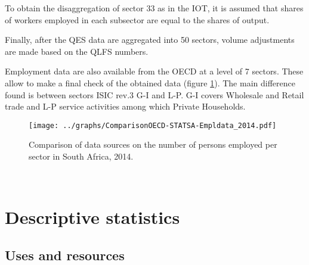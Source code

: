 \documentclass[12pt,english]{article}
\begin{document}
To obtain the disaggregation of sector 33 as in the IOT, it is assumed that shares of workers employed in each subsector are equal to the shares of output.

Finally, after the QES data are aggregated into 50 sectors, volume adjustments are made based on the QLFS numbers.


Employment data are also available from the OECD at a level of 7 sectors. These allow to make a final check of the obtained data (figure \ref{ComparisonOECD-STATSA-Empldata_2014}). The main difference found is between sectors ISIC rev.3 G-I and L-P. G-I covers Wholesale and Retail trade and L-P service activities among which Private Households. 

\begin{figure}[!h]
	\centering
	\texttt{[image: ../graphs/ComparisonOECD-STATSA-Empldata\_2014.pdf]}
	\caption{\label{ComparisonOECD-STATSA-Empldata_2014}Comparison of data sources on the number of persons employed per sector in South Africa, 2014.}
\end{figure}



\


\section{Descriptive statistics}

\subsection{Uses and resources}
\end{document}
